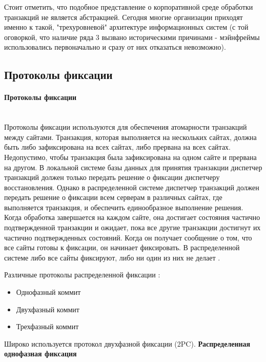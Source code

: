 Стоит отметить, что подобное представление о корпоративной среде обработки транзакций не является абстракцией.
Сегодня многие организации приходят именно к такой, "трехуровневой"  архитектуре информационных
систем (с той оговоркой, что наличие ряда 3 вызвано историческими причинами - мэйнфреймы использовались
первоначально и сразу от них отказаться невозможно).

\subsection{Протоколы фиксации}
\paragraph{Протоколы фиксации}~\\
Протоколы фиксации используются для обеспечения атомарности транзакций между сайтами.
Транзакция, которая выполняется на нескольких сайтах, должна быть либо зафиксирована на всех сайтах, либо прервана на всех сайтах.
Недопустимо, чтобы транзакция была зафиксирована на одном сайте и прервана на другом.
В локальной системе базы данных для принятия транзакции диспетчер транзакций должен только передать решение
о фиксации диспетчеру восстановления. Однако в распределенной системе диспетчер транзакций должен передать
решение о фиксации всем серверам в различных сайтах, где выполняется транзакция, и обеспечить
единообразное выполнение решения. Когда обработка завершается на каждом сайте, она достигает состояния
частично подтвержденной транзакции и ожидает, пока все другие транзакции достигнут их частично подтвержденных состояний.
Когда он получает сообщение о том, что все сайты готовы к фиксации, он начинает фиксировать.
В распределенной системе либо все сайты фиксируют, либо ни один из них не делает \autocite{FixProtocols}.

Различные протоколы распределенной фиксации \autocite{FixProtocols}:
\begin{itemize}
    \item Однофазный коммит
    \item Двухфазный коммит
    \item Трехфазный коммит
\end{itemize}
Широко используется протокол двухфазной фиксации (2PC).
\bigbreak
\textbf{Распределенная однофазная фиксация}

